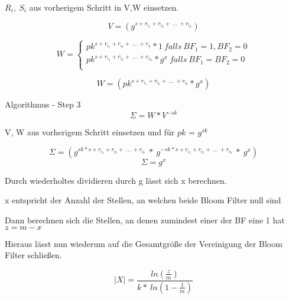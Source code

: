 \documentclass{beamer}
\begin{document}
	\begin{frame}
		\begin{arrowlist}
			\item 	 $R_{i}, \  S_{i}$ aus vorherigem Schritt in V,W einsetzen.
			
		\end{arrowlist}
		
		$$ V = (g^{s + r_{i_{1}} + r_{i_{2}} + \ ...\ +r_{i_{k}}})$$
		
		\[
		W =\left\{
		\begin{array}{ll}
		pk^{s + r_{i_{1}} + r_{i_{2}} + \ ...\ +r_{i_{l}}}*1 \ falls \ BF_{1} = 1,BF_{2} = 0 \\
		pk^{s + r_{i_{1}} + r_{i_{2}} + \ ...\ +r_{i_{m}}}*g^{x} \ falls \ BF_{1} = BF_{2} = 0\\
		\end{array}
		\right.
		\]
		
		$$ W= (pk^{s + r_{i_{1}} + r_{i_{2}} + \ ...\ +r_{i_{k}}}* g^x)$$
		
	\end{frame}
	
	
	\begin{frame}{Algorithmus - Step 3}
		$$\Sigma = W * V^{-sk}$$
		\begin{arrowlist}
			\item V, W aus vorherigem Schritt einsetzen und für $pk$ = $g^{sk}$ 
		\end{arrowlist}
		\vskip 0.1cm 
		
		$$\Sigma = (g^{sk * s + r_{i_{1}} + r_{i_{2}} + \ ...\ +r_{i_{k}}} \ * \ g^{-sk * s + r_{i_{1}} + r_{i_{2}} + \ ...\ +r_{i_{k}}} \ * \ g^x) $$
		$$\Sigma = g^x$$
	\end{frame}
	
	\begin{frame}
		\begin{arrowlist}
			\item Durch wiederholtes dividieren durch g lässt sich x berechnen.
			\item x entspricht der Anzahl der Stellen, an welchen beide Bloom Filter null sind
			\item Dann berechnen sich die Stellen, an denen zumindest einer der BF eine 1 hat $z = m - x$
			\item Hieraus lässt nun wiederum auf die Gesamtgröße der Vereinigung der Bloom Filter schließen.
		\end{arrowlist}
		$$ |X| = \frac{ln( \frac{z}{m})}{k* \ ln(1- \frac{1}{m})}$$
	\end{frame}
	
\end{document}
